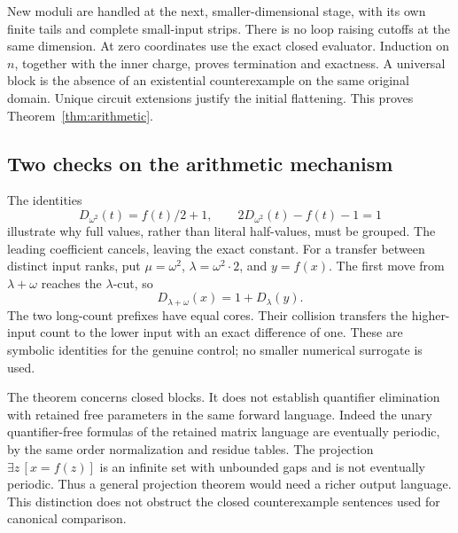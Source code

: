 New moduli are handled at the next, smaller-dimensional stage, with its
own finite tails and complete small-input strips. There is no loop
raising cutoffs at the same dimension. At zero coordinates use the
exact closed evaluator. Induction on \(n\), together with the inner
charge, proves termination and exactness. A universal block is the
absence of an existential counterexample on the same original domain.
Unique circuit extensions justify the initial flattening. This proves
Theorem~\ref{thm:arithmetic}.

\subsection{Two checks on the arithmetic mechanism}

The identities
\[
 D_{\omega^2}(t)=f(t)/2+1,\qquad
 2D_{\omega^2}(t)-f(t)-1=1
\]
illustrate why full values, rather than literal half-values, must be
grouped. The leading coefficient cancels, leaving the exact constant.
For a transfer between distinct input ranks, put
\(\mu=\omega^2\), \(\lambda=\omega^2\cdot2\), and \(y=f(x)\).
The first move from \(\lambda+\omega\) reaches the \(\lambda\)-cut,
so
\[
 D_{\lambda+\omega}(x)=1+D_\lambda(y).
\]
The two long-count prefixes have equal cores. Their collision transfers
the higher-input count to the lower input with an exact difference of
one. These are symbolic identities for the genuine control; no smaller
numerical surrogate is used.

The theorem concerns closed blocks. It does not establish quantifier
elimination with retained free parameters in the same forward language.
Indeed the unary quantifier-free formulas of the retained matrix language
are eventually periodic, by the same order normalization and residue tables. The projection
\(\exists z\,[x=f(z)]\) is an infinite set with unbounded gaps and
is not eventually periodic. Thus a general projection theorem would
need a richer output language. This distinction does not obstruct the
closed counterexample sentences used for canonical comparison.
